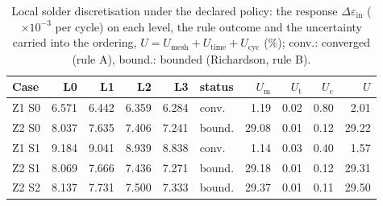 \begin{table}[!t]
\caption{Local solder discretisation under the declared policy: the response $\Delta\varepsilon_{\mathrm{in}}$ ($\times10^{-3}$ per cycle) on each level, the rule outcome and the uncertainty carried into the ordering, $U = U_{\mathrm{mesh}} + U_{\mathrm{time}} + U_{\mathrm{cyc}}$ (\%); conv.: converged (rule A), bound.: bounded (Richardson, rule B).}
\label{tab:localmesh}
\centering
\footnotesize
\setlength{\tabcolsep}{2.2pt}
\begin{tabular}{@{}lrrrrlrrrr@{}}
\toprule
Case & L0 & L1 & L2 & L3 & status & $U_{\mathrm{m}}$ & $U_{\mathrm{t}}$ & $U_{\mathrm{c}}$ & $U$ \\
\midrule
Z1 S0 & 6.571 & 6.442 & 6.359 & 6.284 & conv. & 1.19 & 0.02 & 0.80 & 2.01 \\
Z2 S0 & 8.037 & 7.635 & 7.406 & 7.241 & bound. & 29.08 & 0.01 & 0.12 & 29.22 \\
Z1 S1 & 9.184 & 9.041 & 8.939 & 8.838 & conv. & 1.14 & 0.03 & 0.40 & 1.57 \\
Z2 S1 & 8.069 & 7.666 & 7.436 & 7.271 & bound. & 29.18 & 0.01 & 0.12 & 29.31 \\
Z2 S2 & 8.137 & 7.731 & 7.500 & 7.333 & bound. & 29.37 & 0.01 & 0.11 & 29.50 \\
\bottomrule
\end{tabular}
\end{table}
